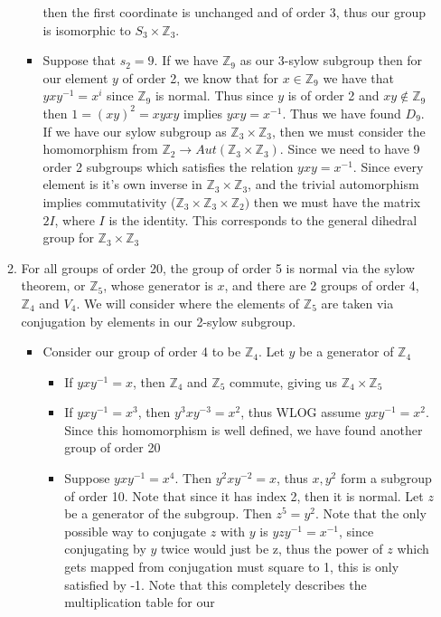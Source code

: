 \documentclass[12pt, letterpaper]{article}
\newcommand{\Z}{\mathbb{Z}}
\begin{document}
\begin{enumerate}
\begin{enumerate}
\begin{itemize}
			then the first coordinate is unchanged and of order 3, thus our group
			is isomorphic to $S_3 \times \Z_3$. 
			\item Suppose that $s_2 = 9$.  If we have $\Z_9$ as our 3-sylow subgroup then for our element $y$ of order 2, we know that for $x \in \Z_9$
			we have that $yxy^{-1} = x^i$ since $\Z_9$ is normal.  Thus since 
			$y$ is of order 2 and $xy \not \in \Z_9$ then $1 = (xy)^2 = xyxy$
			implies $yxy = x^{-1}$.  Thus we have found $D_9$.  If we have 
			our sylow subgroup as $\Z_3 \times \Z_3$, then we must consider 
			the homomorphism from $\Z_2 \to Aut(\Z_3 \times \Z_3)$.  Since we 
			need to have 9 order 2 subgroups which satisfies the relation 
			$yxy = x^{-1}$.  Since every element is it's own inverse in $\Z_3 \times \Z_3$, and the trivial automorphism implies commutativity ($\Z_3 \times \Z_3 \times \Z_2)$ then we must have the matrix $2I$, where $I$ is the identity.  This
			corresponds to the general dihedral group for $\Z_3 \times \Z_3$ 
		\end{itemize}
		\item For all groups of order 20, the group of order 5 is normal via 
		the sylow theorem, or $\Z_5$, whose generator is $x$, and there are 2 groups of order 4, $\Z_4$ 
		and $V_4$.  We will consider where the elements of $\Z_5$ are taken 
		via conjugation by elements in our 2-sylow subgroup.
		\begin{itemize}
			\item Consider our group of order 4 to be $\Z_4$.  Let $y$ be a 
			generator of $\Z_4$
			\begin{itemize}
				\item If $yxy^{-1} = x$, then $\Z_4$ and $\Z_5$ commute, giving
				us $\Z_4 \times \Z_5$
				\item If $yxy^{-1} = x^3$, then $y^3xy^{-3} = x^2$, thus WLOG
				assume $yxy^{-1} = x^2$.  Since this homomorphism is well 
				defined, we have found another group of order 20
				\item Suppose $yxy^{-1} = x^4$.  Then $y^2 x y^{-2} = x$, thus 
				$x,y^2$ form a subgroup of order 10.  Note that since it has 
				index 2, then it is normal.  Let $z$ be a generator of the 
				subgroup.  Then $z^5 = y^2$.  Note that the only possible 
				way to conjugate $z$ with $y$ is $yzy^{-1} = x^{-1}$, since conjugating by $y$ twice would just be z, thus the power of $z$ which gets mapped
				from conjugation must square to 1, this is only satisfied by -1. 						Note 
				that this completely describes the multiplication table for our

\end{itemize}
\end{itemize}
\end{enumerate}
\end{enumerate}
\end{document}
